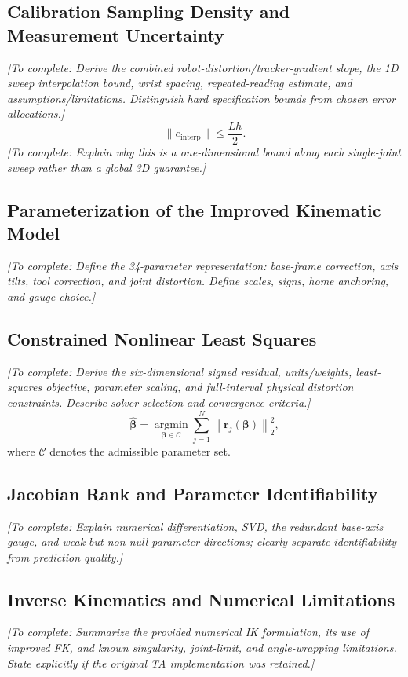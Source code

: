 \documentclass[11pt,letterpaper]{article}
\newcommand{\betav}{\bm{\beta}}
\newcommand{\placeholder}[1]{{\color{placeholdergray}\itshape [To complete: #1]}}
\begin{document}
\subsection{Calibration Sampling Density and Measurement Uncertainty}
\placeholder{Derive the combined robot-distortion/tracker-gradient slope, the 1D sweep interpolation bound, wrist spacing, repeated-reading estimate, and assumptions/limitations. Distinguish hard specification bounds from chosen error allocations.}
\begin{equation}\label{eq:interp}
\big\|e_{\mathrm{interp}}\big\|\le \frac{Lh}{2}.
\end{equation}
\placeholder{Explain why this is a one-dimensional bound along each single-joint sweep rather than a global 3D guarantee.}

\subsection{Parameterization of the Improved Kinematic Model}
\placeholder{Define the 34-parameter representation: base-frame correction, axis tilts, tool correction, and joint distortion. Define scales, signs, home anchoring, and gauge choice.}

\subsection{Constrained Nonlinear Least Squares}
\placeholder{Derive the six-dimensional signed residual, units/weights, least-squares objective, parameter scaling, and full-interval physical distortion constraints. Describe solver selection and convergence criteria.}
\begin{equation}\label{eq:least_squares}
\widehat{\betav}=\underset{\betav\in\mathcal C}{\operatorname{argmin}}
\sum_{j=1}^{N}\left\|\bm r_j(\betav)\right\|_2^2,
\end{equation}
where $\mathcal C$ denotes the admissible parameter set.

\subsection{Jacobian Rank and Parameter Identifiability}
\placeholder{Explain numerical differentiation, SVD, the redundant base-axis gauge, and weak but non-null parameter directions; clearly separate identifiability from prediction quality.}

\subsection{Inverse Kinematics and Numerical Limitations}
\placeholder{Summarize the provided numerical IK formulation, its use of improved FK, and known singularity, joint-limit, and angle-wrapping limitations. State explicitly if the original TA implementation was retained.}
\end{document}
